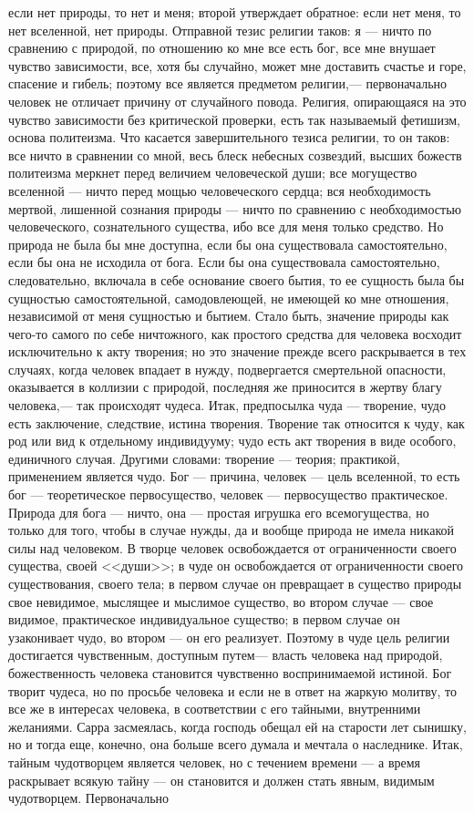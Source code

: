 \documentclass[12pt]{article}
\begin{document}
если нет природы, то нет и меня; второй утверждает обратное: если нет меня, то нет вселенной, нет природы. Отправной тезис религии таков: я --- ничто по сравнению с природой, по отношению ко мне все есть бог, все мне внушает чувство зависимости, все, хотя бы случайно, может мне доставить счастье и горе, спасение и гибель; поэтому все является предметом религии,--- первоначально человек не отличает причину от случайного повода. Религия, опирающаяся на это чувство зависимости без критической проверки, есть так называемый фетишизм, основа политеизма. Что касается завершительного тезиса религии, то он таков: все ничто в сравнении со мной, весь блеск небесных созвездий, высших божеств политеизма меркнет перед величием человеческой души; все могущество вселенной --- ничто перед мощью человеческого сердца; вся необходимость мертвой, лишенной сознания природы --- ничто по сравнению с необходимостью человеческого, сознательного существа, ибо все для меня только средство. Но природа не была бы мне доступна, если бы она существовала самостоятельно, если бы она не исходила от бога. Если бы она существовала самостоятельно, следовательно, включала в себе основание своего бытия, то ее сущность была бы сущностью самостоятельной, самодовлеющей, не имеющей ко мне отношения, независимой от меня сущностью и бытием. Стало быть, значение природы как чего-то самого по себе ничтожного, как простого средства для человека восходит исключительно к акту творения; но это значение прежде всего раскрывается в тех случаях, когда человек впадает в нужду, подвергается смертельной опасности, оказывается в коллизии с природой, последняя же приносится в жертву благу человека,--- так происходят чудеса. Итак, предпосылка чуда --- творение, чудо есть заключение, следствие, истина творения. Творение так относится к чуду, как род или вид к отдельному индивидууму; чудо есть акт творения в виде особого, единичного случая. Другими словами: творение --- теория; практикой, применением является чудо. Бог --- причина, человек --- цель вселенной, то есть бог --- теоретическое первосущество, человек --- первосущество практическое. Природа для бога --- ничто, она --- простая игрушка его всемогущества, но только для того, чтобы в случае нужды, да и вообще природа не имела никакой силы над человеком. В творце человек освобождается от ограниченности своего существа, своей <<души>>; в чуде он освобождается от ограниченности своего существования, своего тела; в первом случае он превращает в существо природы свое невидимое, мыслящее и мыслимое существо, во втором случае --- свое видимое, практическое индивидуальное существо; в первом случае он узаконивает чудо, во втором --- он его реализует. Поэтому в чуде цель религии достигается чувственным, доступным путем--- власть человека над природой, божественность человека становится чувственно воспринимаемой истиной. Бог творит чудеса, но по просьбе человека и если не в ответ на жаркую молитву, то все же в интересах человека, в соответствии с его тайными, внутренними желаниями. Сарра засмеялась, когда господь обещал ей на старости лет сынишку, но и тогда еще, конечно, она больше всего думала и мечтала о наследнике. Итак, тайным чудотворцем является человек, но с течением времени --- а время раскрывает всякую тайну --- он становится и должен стать явным, видимым чудотворцем. Первоначально 
\end{document}
